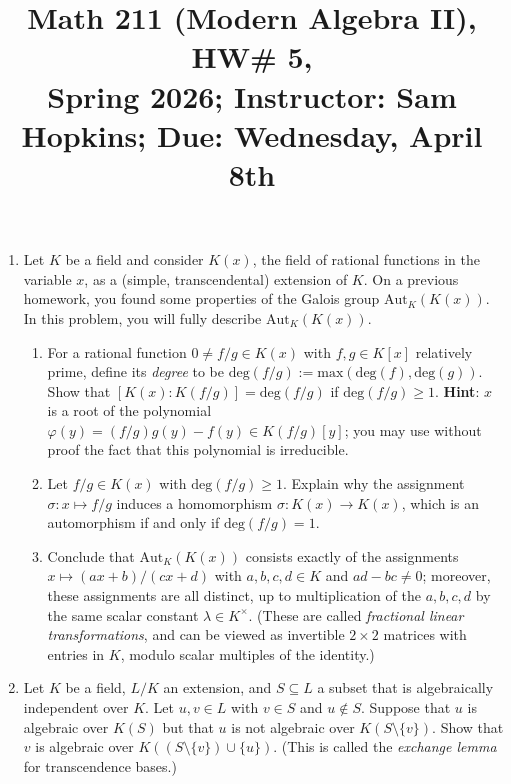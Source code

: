 \documentclass[11pt]{article}
\title{Math 211 (Modern Algebra II), HW\# 5, \\ {\normalsize Spring 2026; Instructor: Sam Hopkins; Due: Wednesday, April 8th}}
\date{}
\begin{document}
\maketitle

\thispagestyle{empty}

\vspace{-1cm}

\begin{enumerate}

\item Let $K$ be a field and consider $K(x)$, the field of rational functions in the variable $x$, as a (simple, transcendental) extension of $K$. On a previous homework, you found some properties of the Galois group $\mathrm{Aut}_K(K(x))$. In this problem, you will fully describe $\mathrm{Aut}_K(K(x))$.
\begin{enumerate}
    \item For a rational function $0 \neq f/g \in K(x)$ with $f,g \in K[x]$ relatively prime, define its \emph{degree} to be $\mathrm{deg}(f/g) := \mathrm{max}(\mathrm{deg}(f),\mathrm{deg}(g))$. Show that $[K(x) : K(f/g)] = \mathrm{deg}(f/g)$ if $\mathrm{deg}(f/g) \geq 1$. {\bf Hint}: $x$ is a root of the polynomial $\varphi(y) = (f/g)g(y)-f(y) \in K(f/g)[y]$; you may use without proof the fact that this polynomial is irreducible.
    \item Let $f/g \in K(x)$ with $\mathrm{deg}(f/g) \geq 1$. Explain why the assignment $\sigma\colon x \mapsto f/g$ induces a homomorphism $\sigma \colon K(x) \to K(x)$, which is an automorphism if and only if $\mathrm{deg}(f/g)=1$.
    \item Conclude that $\mathrm{Aut}_K(K(x))$ consists exactly of the assignments $x \mapsto (ax+b)/(cx+d)$ with $a,b,c,d \in K$ and $ad - bc \neq 0$; moreover, these assignments are all distinct, up to multiplication of the $a,b,c,d$ by the same scalar constant $\lambda \in K^{\times}$. (These are called \emph{fractional linear transformations}, and can be viewed as invertible $2\times 2$ matrices with entries in $K$, modulo scalar multiples of the identity.)
\end{enumerate}

\item Let $K$ be a field, $L/K$ an extension, and $S \subseteq L$ a subset that is algebraically independent over $K$. Let $u, v \in L$ with $v \in S$ and $u \notin S$. Suppose that $u$ is algebraic over $K(S)$ but that $u$ is not algebraic over $K(S \setminus \{v\})$. Show that $v$ is algebraic over $K((S \setminus \{v\}) \cup \{u\})$. (This is called the \emph{exchange lemma} for transcendence bases.)


\end{enumerate}
\end{document}
